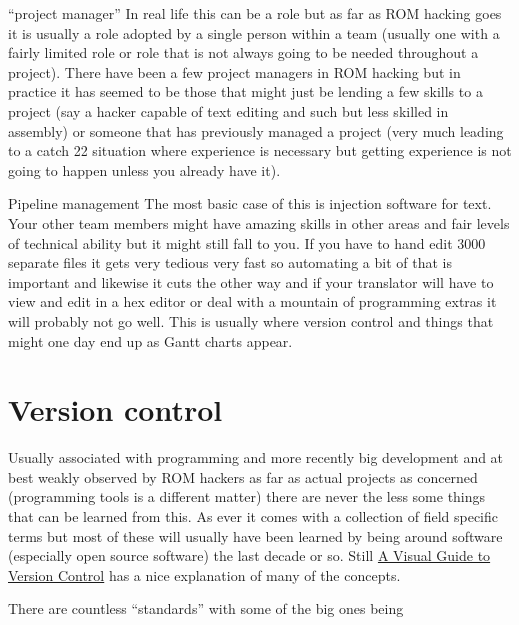 \documentclass[
]{book}
\begin{document}
``project manager'' In real life this can be a role but as far as ROM hacking goes it is usually a role adopted by a single person within a team (usually one with a fairly limited role or role that is not always going to be needed throughout a project). There have been a few project managers in ROM hacking but in practice it has seemed to be those that might just be lending a few skills to a project (say a hacker capable of text editing and such but less skilled in assembly) or someone that has previously managed a project (very much leading to a catch 22 situation where experience is necessary but getting experience is not going to happen unless you already have it).

Pipeline management The most basic case of this is injection software for text. Your other team members might have amazing skills in other areas and fair levels of technical ability but it might still fall to you. If you have to hand edit 3000 separate files it gets very tedious very fast so automating a bit of that is important and likewise it cuts the other way and if your translator will have to view and edit in a hex editor or deal with a mountain of programming extras it will probably not go well. This is usually where version control and things that might one day end up as Gantt charts appear.

\hypertarget{version-control}{%
\section{Version control}\label{version-control}}

Usually associated with programming and more recently big development and at best weakly observed by ROM hackers as far as actual projects as concerned (programming tools is a different matter) there are never the less some things that can be learned from this. As ever it comes with a collection of field specific terms but most of these will usually have been learned by being around software (especially open source software) the last decade or so. Still \href{http://betterexplained.com/articles/a-visual-guide-to-version-control/}{A Visual Guide to Version Control} has a nice explanation of many of the concepts.

There are countless ``standards'' with some of the big ones being
\end{document}
